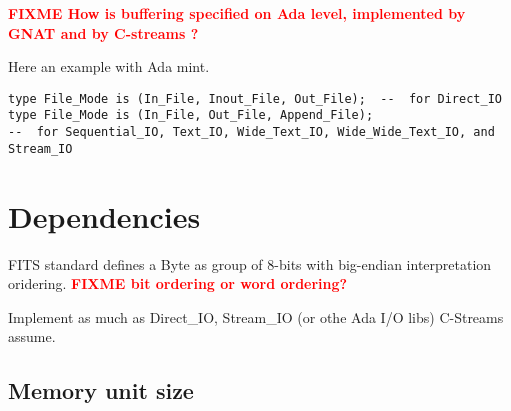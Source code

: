 \documentclass[a4paper,10pt]{article}
\newcommand{\fixme}[1]{\textbf{\textcolor{red}{FIXME #1}}}
\begin{document}
\fixme{How is buffering specified on Ada level, implemented by GNAT and by C-streams ?}

Here an example with Ada mint. 
\begin{verbatim}
type File_Mode is (In_File, Inout_File, Out_File);  --  for Direct_IO
type File_Mode is (In_File, Out_File, Append_File);
--  for Sequential_IO, Text_IO, Wide_Text_IO, Wide_Wide_Text_IO, and Stream_IO
\end{verbatim} 

%

\section{Dependencies}

FITS standard defines a Byte as group of 8-bits with big-endian 
interpretation oridering. \fixme{bit ordering or word ordering?}

Implement as much as Direct\_IO, Stream\_IO (or othe Ada I/O libs) C-Streams assume.

\subsection{Memory unit size}
\end{document}
